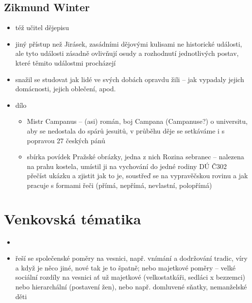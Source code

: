 \documentclass{article}
\begin{document}
\subsection{Zikmund Winter}
\begin{itemize}
  \item též učitel dějepisu
  \item jiný přístup než Jirásek, zasádními dějovými kulisami ne historické události, ale tyto události zásadně ovlivňují osudy a rozhodnutí jednotlivých postav, které těmito událostmi procházejí
  \item snažil se studovat jak lidé ve svých dobách opravdu žili -- jak vypadaly jejich domácnosti, jejich oblečení, apod.
  \item dílo
  \begin{itemize}
    \item Mistr Campanus -- (asi) román, boj Campana (Campanuse?) o universitu, aby se nedostala do spárů jesuitů, v průběhu děje se setkáváme i s popravou 27 českých pánů
    \item sbírka povídek Pražské obrázky, jedna z nich Rozina sebranec -- nalezena na prahu kostela, umístil ji na vychování do jedné rodiny DÚ Č302 přečíst ukázku a zjistit jak to je, soustřeď se na vypravěčskou rovinu a jak pracuje s formami řeči (přímá, nepřímá, nevlastní, polopřímá)
  \end{itemize}
\end{itemize}

\section{Venkovská tématika}
\begin{itemize}
  \item {}
  \item řeší se společenské poměry na vesnici, např. vnímání a dodržování tradic, víry a když je něco jiné, nové tak je to špatně; nebo majetkové poměry -- velké sociální rozdíly na vesnici ať už majetkové (velkostatkáři, sedláci x bezzemci) nebo hierarchální (postavení žen), nebo např. domluvené sňatky, nemanželské děti
\end{itemize}
\end{document}
